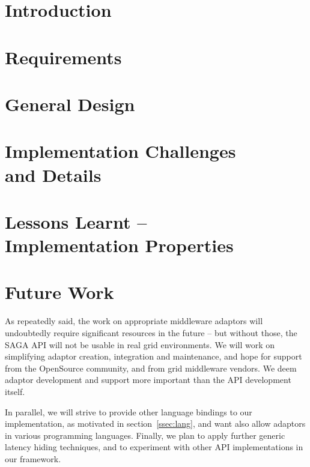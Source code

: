\documentclass{acm_proc_article-sp}
\begin{document}
  \section{Introduction}
    \label{sec:intro}
    

  \section{Requirements}
    \label{sec:requirements}
    

  \section{General Design}
    \label{sec:generaldesign}
    

  \section{Implementation Challenges\\ and Details}
    \label{sec:details}
    

  \section{Lessons Learnt --\\ Implementation Properties}
    \label{sec:props}
    

	\section{Future Work}
		\label{sec:futurework}
		
	 As repeatedly said, the work on appropriate middleware adaptors will
	 undoubtedly require significant resources in the future -- but
	 without those, the SAGA API will not be usable in real grid
	 environments.  We will work on simplifying adaptor creation,
	 integration and maintenance, and hope for support from the OpenSource
	 community, and from grid middleware vendors.  We deem adaptor
	 development and support more important than the API development
	 itself.
	
	 In parallel, we will strive to provide other language bindings to our
	 implementation, as motivated in section~\ref{ssec:lang}, and want also
	 allow adaptors in various programming languages.  Finally, we plan to
	 apply further generic latency hiding techniques, and to experiment
	 with other API implementations in our framework.
\end{document}
